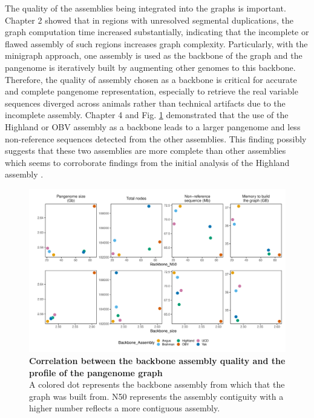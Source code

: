 \documentclass[../main.tex]{subfiles}
\begin{document}
The quality of the assemblies being integrated into the graphs is important. Chapter 2 showed that in regions with unresolved segmental duplications, the graph computation time increased substantially, indicating that the incomplete or flawed assembly of such regions increases graph complexity. Particularly, with the minigraph approach, one assembly is used as the backbone of the graph and the pangenome is iteratively built by augmenting other genomes to this backbone. Therefore, the quality of assembly chosen as a backbone is critical for accurate and complete pangenome representation, especially to retrieve the real variable sequences diverged across animals rather than technical artifacts due to the incomplete assembly. Chapter 4 and Fig. \ref{fig52:backeff}  demonstrated that the use of the Highland or OBV assembly as a backbone leads to a larger pangenome and less non-reference sequences detected from the other assemblies. This finding possibly suggests that these two assemblies are more complete than other assemblies which seems to corroborate findings from the initial analysis of the Highland assembly \citep{rice2020continuous}. 

\begin{figure}[!htb]
   \centering
   \includegraphics[width=\textwidth]{discuss/fig52.pdf}
       \vspace{1mm}
       \caption[Correlation between the backbone assembly quality and the profile of the pangenome graph]{\textbf{Correlation between the backbone assembly quality and the profile of the pangenome graph} \\
       \footnotesize{A colored dot represents the backbone assembly from which that the graph was built from. 
        N50 represents the assembly contiguity with a higher number reflects a more contiguous assembly. 
       }}
       \label{fig52:backeff}
\end{figure}
\end{document}
